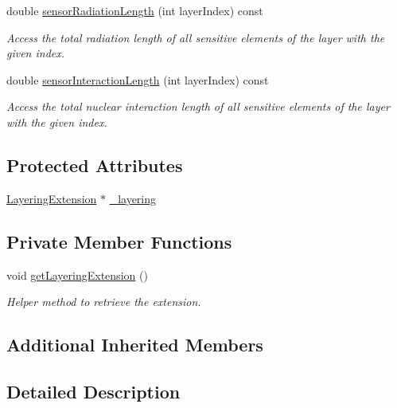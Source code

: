 \begin{DoxyCompactItemize}
double \hyperlink{class_d_d4hep_1_1_d_d_rec_1_1_layered_subdetector_afa7d4fe8408b38a84c11900e5c080979}{sensor\+Radiation\+Length} (int layer\+Index) const
\begin{DoxyCompactList}\small\item\em Access the total radiation length of all sensitive elements of the layer with the given index. \end{DoxyCompactList}\item 
double \hyperlink{class_d_d4hep_1_1_d_d_rec_1_1_layered_subdetector_a75e890bc57b982ab0c8b50bf105bd823}{sensor\+Interaction\+Length} (int layer\+Index) const
\begin{DoxyCompactList}\small\item\em Access the total nuclear interaction length of all sensitive elements of the layer with the given index. \end{DoxyCompactList}\end{DoxyCompactItemize}
\subsection*{Protected Attributes}
\begin{DoxyCompactItemize}
\item 
\hyperlink{class_d_d4hep_1_1_d_d_rec_1_1_layering_extension}{Layering\+Extension} $\ast$ \hyperlink{class_d_d4hep_1_1_d_d_rec_1_1_layered_subdetector_a01f66cc99e59bf522dff6c7295235692}{\+\_\+layering}
\end{DoxyCompactItemize}
\subsection*{Private Member Functions}
\begin{DoxyCompactItemize}
\item 
void \hyperlink{class_d_d4hep_1_1_d_d_rec_1_1_layered_subdetector_a6abda5bb466aecbc60735dabe056a0eb}{get\+Layering\+Extension} ()
\begin{DoxyCompactList}\small\item\em Helper method to retrieve the extension. \end{DoxyCompactList}\end{DoxyCompactItemize}
\subsection*{Additional Inherited Members}


\subsection{Detailed Description}



